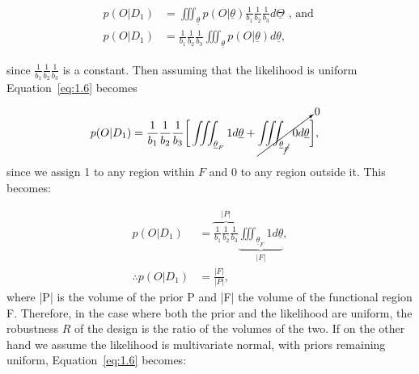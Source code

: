 \begin{align}
p(O|D_1) &= \displaystyle \iiint_{\underline{\theta}} p(O|\underline{\theta})\frac{1}{b_1}\frac{1}{b_2}\frac{1}{b_3}d\underline{\Theta} \text{ , and }\\
p(O|D_1) &= \frac{1}{b_1}\frac{1}{b_2}\frac{1}{b_3} \displaystyle \iiint_{\underline{\theta}}p(O|\underline{\theta})d\underline{\theta}, \label{eq:1.6}
\end{align}

\noindent since $\frac{1}{b_1}\frac{1}{b_2}\frac{1}{b_3} $ is a constant. Then assuming that the likelihood is uniform Equation~\ref{eq:1.6} becomes

\begin{align}
p(O|D_1) &= \frac{1}{b_1}\frac{1}{b_2}\frac{1}{b_3} \bigg[\displaystyle \iiint_{\underline{\theta}_F} 1 d\underline{\theta} +\cancelto{0}{\displaystyle \iiint_{\underline{\theta}_{\cancel{F} }} 0 d\underline{\theta}}\bigg],  
\end{align}

\noindent since we assign 1 to any region within $F$ and 0 to any region outside it. This becomes:

\begin{align}
p(O|D_1) &= \overbrace{\frac{1}{b_1}\frac{1}{b_2}\frac{1}{b_3}}^{|P|} \underbrace{\displaystyle \iiint_{\underline{\theta}_F} 1 d\underline{\theta}}_{|F|}, \\
\therefore p(O|D_1) &= \frac{|F|}{|P|},
\end{align}
where |P| is the volume of the prior P and |F| the volume of the functional region F. Therefore, in the case where both the prior and the likelihood are uniform, the robustness $R$ of the design is the ratio of the volumes of the two. If on the other hand we assume the likelihood is multivariate normal, with priors remaining uniform, Equation~\ref{eq:1.6} becomes: 





